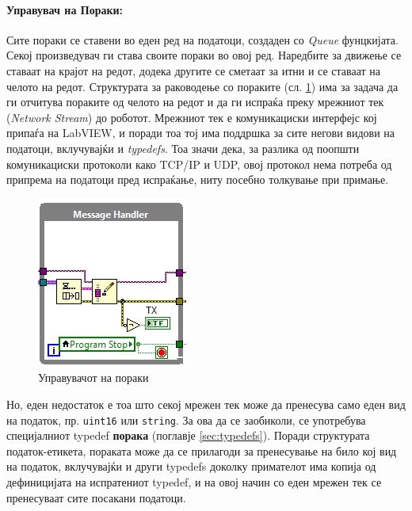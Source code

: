 \documentclass[11pt]{article}
\begin{document}
    \bigbreak

    \paragraph{Управувач на Пораки:\\} %
      \label{sec:message_handler}
      Сите пораки се ставени во еден ред на податоци, создаден со \textit{Queue} фунцкијата. Секој произведувач ги става своите пораки во овој ред. Наредбите за движење се ставаат на крајот на редот, додека другите се сметаат за итни и се ставаат на челото на редот. Структурата за раководење со пораките (сл. \ref{fig:msg_handler}) има за задача да ги отчитува пораките од челото на редот и да ги испраќа преку мрежниот тек (\textit{Network Stream}) до роботот. Мрежниот тек е комуникациски интерфејс кој припаѓа на LabVIEW, и поради тоа тој има поддршка за сите негови видови на податоци, вклучувајќи и \textit{typedefs}. Тоа значи дека, за разлика од поопшти комуникациски протоколи како TCP/IP и UDP, овој протокол нема потреба од припрема на податоци пред испраќање, ниту посебно толкување при примање.

      \begin{figure}[H]
        \centering
        \includegraphics[width=0.35\linewidth]{./images/message_handler.png}
        \caption{Управувачот на пораки}
        \label{fig:msg_handler}
        \end{figure}

      Но, еден недостаток е тоа што секој мрежен тек може да пренесува само еден вид на податок, пр. \verb+uint16+ или \verb+string+. За ова да се заобиколи, се употребува специјалниот typedef \textbf{порака} (поглавје \ref{sec:typedefs}). Поради структурата податок-етикета, пораката може да се прилагоди за пренесување на било кој вид на податок, вклучувајќи и други typedefs доколку примателот има копија од дефиницијата на испратениот typedef, и на овој начин со еден мрежен тек се пренесуваат сите посакани податоци.
\end{document}
